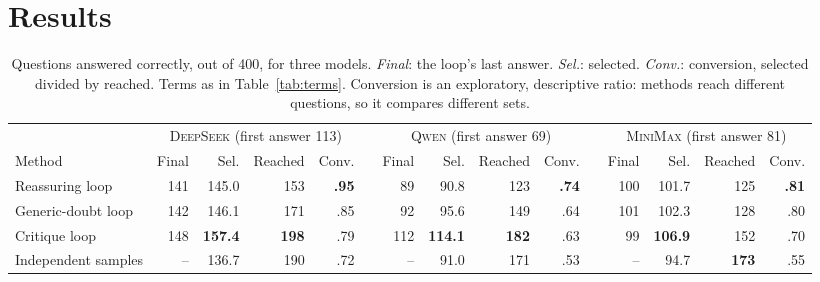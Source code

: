 \documentclass[11pt]{article}
\newcommand{\ds}{\textsc{DeepSeek}}
\newcommand{\qw}{\textsc{Qwen}}
\newcommand{\mm}{\textsc{MiniMax}}
\begin{document}
\section{Results}

\begin{table}[t]
\centering
\small
\setlength{\tabcolsep}{3.4pt}
\begin{tabular}{@{}l rrrr c rrrr c rrrr@{}}
\toprule
 & \multicolumn{4}{c}{\ds{} (first answer 113)} & & \multicolumn{4}{c}{\qw{} (first answer 69)} & & \multicolumn{4}{c}{\mm{} (first answer 81)} \\
\cmidrule(lr){2-5}\cmidrule(lr){7-10}\cmidrule(l){12-15}
Method & Final & Sel. & Reached & Conv. & & Final & Sel. & Reached & Conv. & & Final & Sel. & Reached & Conv. \\
\midrule
Reassuring loop & 141 & 145.0 & 153 & \textbf{.95} & & 89 & 90.8 & 123 & \textbf{.74} & & 100 & 101.7 & 125 & \textbf{.81} \\
Generic-doubt loop & 142 & 146.1 & 171 & .85 & & 92 & 95.6 & 149 & .64 & & 101 & 102.3 & 128 & .80 \\
Critique loop & 148 & \textbf{157.4} & \textbf{198} & .79 & & 112 & \textbf{114.1} & \textbf{182} & .63 & & 99 & \textbf{106.9} & 152 & .70 \\
Independent samples & -- & 136.7 & 190 & .72 & & -- & 91.0 & 171 & .53 & & -- & 94.7 & \textbf{173} & .55 \\
\bottomrule
\end{tabular}
\caption{Questions answered correctly, out of 400, for three models. \emph{Final}: the loop's last answer. \emph{Sel.}: selected. \emph{Conv.}: conversion, selected divided by reached. Terms as in Table~\ref{tab:terms}. Conversion is an exploratory, descriptive ratio: methods reach different questions, so it compares different sets.}
\label{tab:main}
\end{table}
\end{document}
